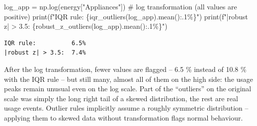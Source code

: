 \documentclass[
  letterpaper,
  DIV=11,
  numbers=noendperiod]{scrreprt}
\newenvironment{Shaded}{\begin{snugshade}}{\end{snugshade}}
\newcommand{\BuiltInTok}[1]{\textcolor[rgb]{0.00,0.23,0.31}{#1}}
\newcommand{\CommentTok}[1]{\textcolor[rgb]{0.37,0.37,0.37}{#1}}
\newcommand{\NormalTok}[1]{\textcolor[rgb]{0.00,0.23,0.31}{#1}}
\newcommand{\OperatorTok}[1]{\textcolor[rgb]{0.37,0.37,0.37}{#1}}
\newcommand{\SpecialCharTok}[1]{\textcolor[rgb]{0.37,0.37,0.37}{#1}}
\newcommand{\SpecialStringTok}[1]{\textcolor[rgb]{0.13,0.47,0.30}{#1}}
\newcommand{\StringTok}[1]{\textcolor[rgb]{0.13,0.47,0.30}{#1}}
\begin{document}
\begin{tcolorbox}[enhanced jigsaw, left=2mm, title=\textcolor{quarto-callout-caution-color}{\faFire}\hspace{0.5em}{Solution to Exercise 4}, opacityback=0, breakable, rightrule=.15mm, arc=.35mm, toptitle=1mm, colbacktitle=quarto-callout-caution-color!10!white, opacitybacktitle=0.6, coltitle=black, colframe=quarto-callout-caution-color-frame, bottomrule=.15mm, leftrule=.75mm, bottomtitle=1mm, titlerule=0mm, toprule=.15mm, colback=white]

\begin{Shaded}
\begin{Highlighting}[]
\NormalTok{log\_app }\OperatorTok{=}\NormalTok{ np.log(energy[}\StringTok{"Appliances"}\NormalTok{])             }\CommentTok{\# log transformation (all values are positive)}
\BuiltInTok{print}\NormalTok{(}\SpecialStringTok{f"IQR rule:          }\SpecialCharTok{\{}\NormalTok{iqr\_outliers(log\_app)}\SpecialCharTok{.}\NormalTok{mean()}\SpecialCharTok{:.1\%\}}\SpecialStringTok{"}\NormalTok{)}
\BuiltInTok{print}\NormalTok{(}\SpecialStringTok{f"|robust z| \textgreater{} 3.5:  }\SpecialCharTok{\{}\NormalTok{robust\_z\_outliers(log\_app)}\SpecialCharTok{.}\NormalTok{mean()}\SpecialCharTok{:.1\%\}}\SpecialStringTok{"}\NormalTok{)}
\end{Highlighting}
\end{Shaded}

\begin{verbatim}
IQR rule:          6.5%
|robust z| > 3.5:  7.4%
\end{verbatim}

After the log transformation, fewer values are flagged -- 6.5 \% instead
of 10.8 \% with the IQR rule -- but still many, almost all of them on
the high side: the usage peaks remain unusual even on the log scale.
Part of the ``outliers'' on the original scale was simply the long right
tail of a skewed distribution, the rest are real usage events. Outlier
rules implicitly assume a roughly symmetric distribution -- applying
them to skewed data without transformation flags normal behaviour.

\end{tcolorbox}
\end{document}

